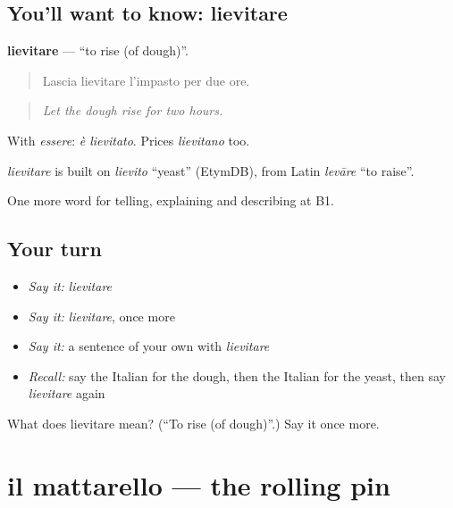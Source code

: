\subsection*{You'll want to know: lievitare}
\textbf{lievitare} — \textquotedblleft{}to rise (of dough)\textquotedblright{}.

\begin{quote}
Lascia lievitare l'impasto per due ore.
\end{quote}

\begin{quote}
\emph{Let the dough rise for two hours.}
\end{quote}

With \emph{essere}: \emph{è lievitato}. Prices \emph{lievitano} too.

\begin{cousinweb}
\emph{lievitare} is built on \emph{lievito} \textquotedblleft{}yeast\textquotedblright{} (EtymDB), from Latin \emph{levāre} \textquotedblleft{}to raise\textquotedblright{}.
\end{cousinweb}

\begin{grammarlens}[title={What you've built}]
One more word for telling, explaining and describing at B1.
\end{grammarlens}

\subsection*{Your turn}
\begin{itemize}
\raggedright
  \item \emph{Say it:} \emph{lievitare}
  \item \emph{Say it:} \emph{lievitare}, once more
  \item \emph{Say it:} a sentence of your own with \emph{lievitare}
  \item \emph{Recall:} say the Italian for the dough, then the Italian for the yeast, then say \emph{lievitare} again
\end{itemize}

\begin{tcolorbox}[breakable,colback=teal!4,colframe=teal!35!black,title={Before you move on}]
What does lievitare mean? (\textquotedblleft{}To rise (of dough)\textquotedblright{}.) Say it once more.
\end{tcolorbox}
\section[il mattarello]{il mattarello — the rolling pin}

